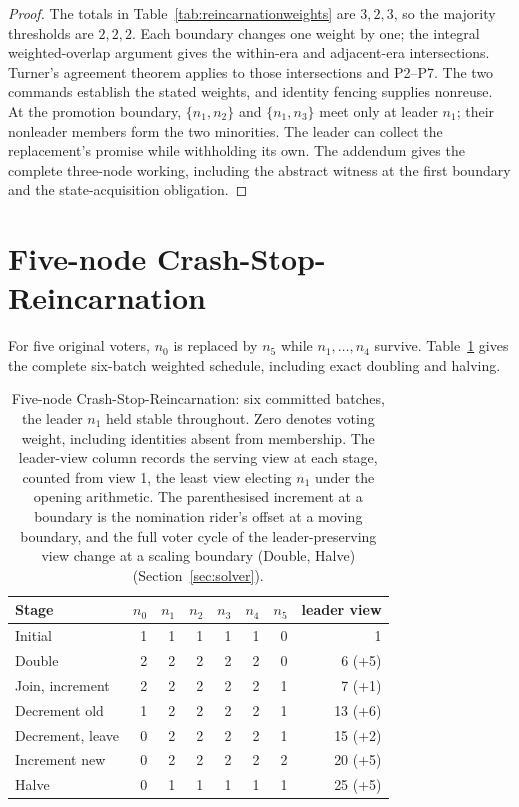 \documentclass[10pt,journal,letterpaper]{IEEEtran}
\begin{document}
\begin{proof}
The totals in Table~\ref{tab:reincarnationweights} are $3,2,3$, so the majority thresholds are $2,2,2$. Each boundary changes one weight by one; the integral weighted-overlap argument gives the within-era and adjacent-era intersections. Turner's agreement theorem applies to those intersections and P2--P7. The two commands establish the stated weights, and identity fencing supplies nonreuse. At the promotion boundary, $\{n_1,n_2\}$ and $\{n_1,n_3\}$ meet only at leader $n_1$; their nonleader members form the two minorities. The leader can collect the replacement's promise while withholding its own. The addendum gives the complete three-node working, including the abstract witness at the first boundary and the state-acquisition obligation.
\end{proof}

\section{Five-node Crash-Stop-Reincarnation}\label{sec:five-node-reincarnation}
For five original voters, $n_0$ is replaced by $n_5$ while $n_1,\ldots,n_4$ survive. Table~\ref{tab:weights} gives the complete six-batch weighted schedule, including exact doubling and halving.

\begin{table}[t]
\centering
\caption{Five-node Crash-Stop-Reincarnation: six committed batches, the leader $n_1$ held stable throughout. Zero denotes voting weight, including identities absent from membership. The leader-view column records the serving view at each stage, counted from view 1, the least view electing $n_1$ under the opening arithmetic. The parenthesised increment at a boundary is the nomination rider's offset at a moving boundary, and the full voter cycle of the leader-preserving view change at a scaling boundary (Double, Halve) (Section~\ref{sec:solver}).}
\label{tab:weights}
\small
\begin{tabular}{l*{7}{r}}
\toprule
Stage & $n_0$ & $n_1$ & $n_2$ & $n_3$ & $n_4$ & $n_5$ & leader view\\
\midrule
Initial & 1&1&1&1&1&0 & 1\\
Double & 2&2&2&2&2&0 & 6 (+5)\\
Join, increment & 2&2&2&2&2&1 & 7 (+1)\\
Decrement old & 1&2&2&2&2&1 & 13 (+6)\\
Decrement, leave & 0&2&2&2&2&1 & 15 (+2)\\
Increment new & 0&2&2&2&2&2 & 20 (+5)\\
Halve & 0&1&1&1&1&1 & 25 (+5)\\
\bottomrule
\end{tabular}
\end{table}
\end{document}
